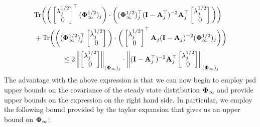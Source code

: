 \begin{align}
\label{eq:lotpmain1}
&\text{Tr}\bigg(\bigg(\begin{bmatrix}\lambda_j^{1/2}\\0\end{bmatrix}^{\top} (\boldsymbol{\Phi}_{\infty}^{1/2})_j \bigg)\cdot\bigg((\boldsymbol{\Phi}_{\infty}^{1/2})_j ^{\top} (\mathbf{I}-\mathbf{A}_j^{\top})^{-2}\mathbf{A}_j^{\top}\begin{bmatrix}\lambda_j^{1/2}\\0\end{bmatrix}\bigg)\bigg)\nonumber\\&+\text{Tr}\bigg(\bigg((\boldsymbol{\Phi}_{\infty}^{1/2})_j ^{\top} \begin{bmatrix}\lambda_j^{1/2}\\0\end{bmatrix}\bigg)\cdot\bigg(\begin{bmatrix}\lambda_j^{1/2}\\0\end{bmatrix}^{\top}\mathbf{A}_j(\mathbf{I}-\mathbf{A}_j)^{-2}(\boldsymbol{\Phi}_{\infty}^{1/2})_j \bigg)\bigg)\nonumber\\
&\quad\quad\quad\quad\leq2\left\lVert\begin{bmatrix}\lambda_j^{1/2}\\0\end{bmatrix}\right\rVert_{(\boldsymbol{\Phi}_{\infty})_j}\cdot\left\lVert(\mathbf{I}-\mathbf{A}_j^{\top})^{-2}\mathbf{A}_j^{\top}\begin{bmatrix}\lambda_j^{1/2}\\0\end{bmatrix}\right\rVert_{(\boldsymbol{\Phi}_{\infty})_j}
\end{align}
The advantage with the above expression is that we can now begin to employ psd upper bounds on the covariance of the steady state distribution $\boldsymbol{\Phi}_{\infty}$ and provide upper bounds on the expression on the right hand side. In particular, we employ the following bound provided by the taylor expansion that gives us an upper bound on $\boldsymbol{\Phi}_{\infty}$:
